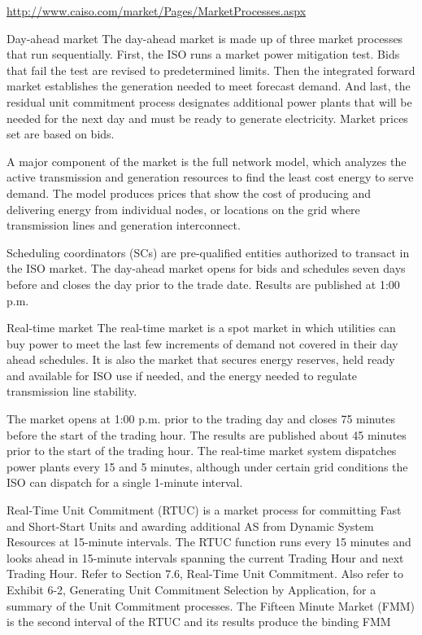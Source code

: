 \documentclass[11pt,a4paper]{article}
\begin{document}
\url{http://www.caiso.com/market/Pages/MarketProcesses.aspx}

Day-ahead market
The day-ahead market is made up of three market processes that run sequentially. First, the ISO runs a market power mitigation test. Bids that fail the test are revised to predetermined limits. Then the integrated forward market establishes the generation needed to meet forecast demand. And last, the residual unit commitment process designates additional power plants that will be needed for the next day and must be ready to generate electricity. Market prices set are based on bids.

A major component of the market is the full network model, which analyzes the active transmission and generation resources to find the least cost energy to serve demand. The model produces prices that show the cost of producing and delivering energy from individual nodes, or locations on the grid where transmission lines and generation interconnect.

Scheduling coordinators (SCs) are pre-qualified entities authorized to transact in the ISO market. The day-ahead market opens for bids and schedules seven days before and closes the day prior to the trade date. Results are published at 1:00 p.m.

Real-time market
The real-time market is a spot market in which utilities can buy power to meet the last few increments of demand not covered in their day ahead schedules. It is also the market that secures energy reserves, held ready and available for ISO use if needed, and the energy needed to regulate transmission line stability.

The market opens at 1:00 p.m. prior to the trading day and closes 75 minutes before the start of the trading hour. The results are published about 45 minutes prior to the start of the trading hour. The real-time market system dispatches power plants every 15 and 5 minutes, although under certain grid conditions the ISO can dispatch for a single 1-minute interval.

Real-Time Unit Commitment (RTUC) is a market process for committing Fast and Short-Start Units and awarding additional AS from Dynamic System Resources at 15-minute intervals. The RTUC function runs every 15 minutes and looks ahead in 15-minute intervals spanning the current Trading Hour and next Trading Hour. Refer to Section 7.6, Real-Time Unit Commitment. Also refer to Exhibit 6-2, Generating Unit Commitment Selection by Application, for a summary of the Unit Commitment processes.
The Fifteen Minute Market (FMM) is the second interval of the RTUC and its results produce the binding FMM
\end{document}

